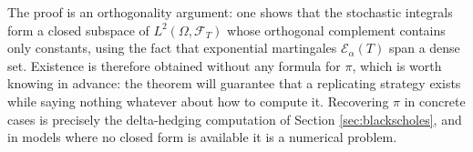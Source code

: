  The proof is an orthogonality argument: one shows 
that the stochastic integrals form a closed subspace of $L^2(\Omega,\mathcal{F}_T)$ whose orthogonal 
complement contains only constants, using the fact that exponential martingales 
$\mathcal{E}_\alpha(T)$ span a dense set. Existence is therefore obtained without any formula for 
$\pi$, which is worth knowing in advance: the theorem will guarantee that a replicating strategy 
exists while saying nothing whatever about how to compute it. Recovering $\pi$ in concrete cases 
is precisely the delta-hedging computation of Section \ref{sec:blackscholes}, and in models where no 
closed form is available it is a numerical problem.


